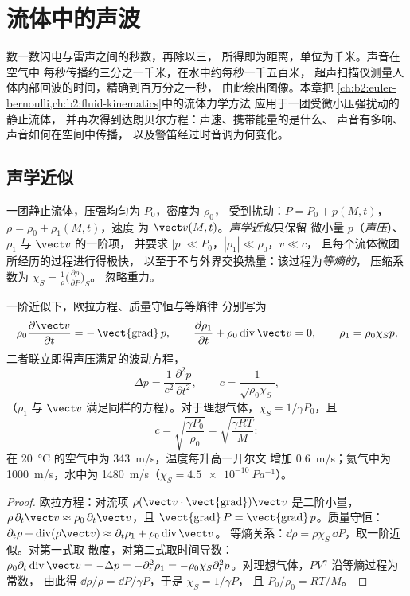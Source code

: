 \chapter{流体中的声波}\label{ch:b2:sound-waves}

数一数闪电与雷声之间的秒数，再除以三，
所得即为距离，单位为千米。声音在空气中
每秒传播约三分之一千米，在水中约每秒一千五百米，
超声扫描仪测量人体内部回波的时间，精确到百万分之一秒，
由此绘出图像。本章把
\cref{ch:b2:euler-bernoulli,ch:b2:fluid-kinematics}中的流体力学方法
应用于一团受微小压强扰动的静止流体，
并再次得到达朗贝尔方程：声速、携带能量的是什么、
声音有多响、声音如何在空间中传播，
以及警笛经过时音调为何变化。

\section{声学近似}

\begin{definition}[声学扰动]\label{def:b2:sound-waves:approximation}
一团静止流体，压强均匀为 $P_0$，密度为 $\rho_0$，
受到扰动：$P = P_0 + p(M, t)$，$\rho = \rho_0 + \rho_1(M, t)$，速度
为 $\vect v(M, t)$。\emph{声学近似}只保留
微小量 $p$（\emph{声压}）、$\rho_1$ 与 $\vect v$ 的一阶项，
并要求 $|p| \ll P_0$，$|\rho_1| \ll \rho_0$，$v \ll c$，
且每个流体微团所经历的过程进行得极快，
以至于不与外界交换热量：该过程为\emph{等熵的}，
压缩系数为 $\chi_S = \frac1\rho\bigl(\frac{\partial\rho}{\partial P}\bigr)_S$。
忽略重力。
\end{definition}

\begin{theorem}[声波]\label{thm:b2:sound-waves:equation}
一阶近似下，欧拉方程、质量守恒与等熵律
分别写为
\[
\rho_0\frac{\partial\vect v}{\partial t} = -\operatorname{\vect{grad}}p , \qquad
\frac{\partial\rho_1}{\partial t} + \rho_0\operatorname{div}\vect v = 0 , \qquad
\rho_1 = \rho_0\chi_Sp ,
\]
二者联立即得声压满足的波动方程，
\[
\Delta p = \frac1{c^2}\frac{\partial^2p}{\partial t^2} , \qquad
c = \frac1{\sqrt{\rho_0\chi_S}} ,
\]
（$\rho_1$ 与 $\vect v$ 满足同样的方程）。对于理想气体，$\chi_S =
1/\gamma P_0$，且
\[
c = \sqrt{\frac{\gamma P_0}{\rho_0}} = \sqrt{\frac{\gamma RT}{M}} :
\]
在 \qty{20}{\degreeCelsius} 的空气中为 \qty{343}{m/s}，温度每升高一开尔文
增加 \qty{0.6}{m/s}；氦气中为 \qty{1000}{m/s}，水中为 \qty{1480}{m/s}（$\chi_S =
\qty{4.5e-10}{Pa^{-1}}$）。
\end{theorem}

\begin{proof}
欧拉方程：对流项 $\rho(\vect v\cdot\operatorname{\vect{grad}})\vect v$
是二阶小量，$\rho\,\partial_t\vect v \approx \rho_0\,\partial_t\vect v$，且
$\operatorname{\vect{grad}}P = \operatorname{\vect{grad}}p$。质量守恒：$\partial_t\rho +
\operatorname{div}(\rho\vect v) \approx \partial_t\rho_1 + \rho_0\operatorname{div}\vect v$。
等熵关系：$\dd\rho = \rho\chi_S\,\dd P$，取一阶近似。对第一式取
散度，对第二式取时间导数：
$\rho_0\partial_t\operatorname{div}\vect v = -\Delta p = -\partial_t^2\rho_1 = -\rho_0\chi_S
\partial_t^2p$。对理想气体，$PV^\gamma$ 沿等熵过程为常数，
由此得 $\dd\rho/\rho = \dd P/\gamma P$，于是 $\chi_S = 1/\gamma P$，
且 $P_0/\rho_0 = RT/M$。
\end{proof}

